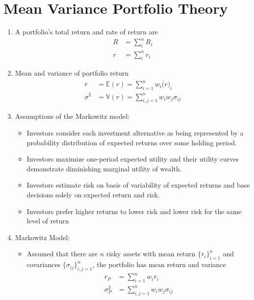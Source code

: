 \documentclass[12pt,twoside]{article}
\begin{document}
\newpage

\section{Mean Variance Portfolio Theory}
\begin{enumerate}
\item A portfolio's total return and rate of return are
	\begin{align*}
		R &= \sum_i^n R_i\\
		r  &= \sum_i^n r_i
	\end{align*}

\item Mean and variance of portfolio return
\begin{align*}
	\overline{r} 	& = \mathbb{E}(r) = \sum_{i=1}^n w_i \overline(r)_i\\
	\sigma^2 		& = \mathbb{V}(r) = \sum_{i,j=1}^n w_iw_j\sigma_{ij}
\end{align*}

\item Assumptions of the Markowitz model:
\begin{itemize}
	\item Investors consider each investment alternative as being represented by a probability distribution of expected returns over some holding period.
	\item Investors maximize one-period expected utility and their utility curves demonstrate diminishing marginal utility of wealth.
	\item Investors estimate risk on basis of variability of expected returns and base decisions solely on expected return and risk.
	\item Investors prefer higher returns to lower risk and lower risk for the same level of return
\end{itemize}

\item Markowitz Model:
\begin{itemize}
	\item Assumed that there are $n$ risky assets with mean return $\lbrace \overline{r}_i\rbrace_{i=1}^n$ and covariances $\lbrace \sigma_{ij}\rbrace_{i,j=1}^n$, the portfolio has mean return and variance
	\begin{align*}
		\overline{r}_P	& = \sum_{i=1}^n w_i \overline{r}_i\\
		\sigma_P^2		& = \sum_{i,j=1}^n w_iw_j\sigma_{ij}
	\end{align*}
	

\end{itemize}
\end{enumerate}
\end{document}
